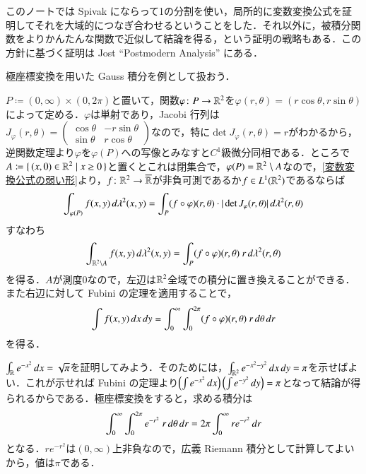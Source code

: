 \begin{que}[**]
このノートでは Spivak にならって1の分割を使い，局所的に変数変換公式を証明してそれを大域的につなぎ合わせるということをした．それ以外に，被積分関数をよりかんたんな関数で近似して結論を得る，という証明の戦略もある．この方針に基づく証明は Jost ``Postmodern Analysis'' にある．
\end{que}

極座標変換を用いた Gauss 積分を例として扱おう．

\begin{exm}[極座標変換]$P \coloneqq (0, \infty) \times (0,2\pi)$と置いて，関数$\varphi \colon P \to \mathbb{R}^2$を$\varphi(r,\theta) = (r \cos \theta, r \sin \theta)$によって定める．$\varphi$は単射であり，Jacobi 行列は$
J_{\varphi}(r,\theta) =
    \begin{pmatrix}
    \cos \theta & -r \sin \theta \\
    \sin \theta & r \cos \theta
    \end{pmatrix}
$なので，特に$\det J_\varphi(r,\theta) = r$がわかるから，逆関数定理より$\varphi$を$\varphi(P)$への写像とみなすと$C^1$級微分同相である．ところで$A \coloneqq \set{(x,0) \in \mathbb{R}^2 | x \geq 0}$と置くとこれは閉集合で，$\varphi(P) = \mathbb{R}^2 \setminus A$なので，\cref{変数変換公式の弱い形}より，$f \colon \mathbb{R}^2 \to \overline{\mathbb{R}}$が非負可測であるか$f \in L^1(\mathbb{R}^2)$であるならば
\begin{equation}
\int_{\varphi(P)} f(x,y) \mathop{}\!d \lambda^2(x,y) = \int_P (f \circ \varphi) (r, \theta) \cdot |\det J_\varphi (r,\theta)| \mathop{}\!d\lambda^2(r,\theta)
\end{equation}すなわち
\begin{equation}
\int_{\mathbb{R}^2 \setminus A} f(x,y) \mathop{}\!d \lambda^2(x,y) = \int_P (f \circ \varphi) (r, \theta) \ r \mathop{}\!d\lambda^2(r,\theta)
\end{equation}を得る．$A$が測度0なので，左辺は$\mathbb{R}^2$全域での積分に置き換えることができる．また右辺に対して Fubini の定理を適用することで，
\begin{equation}
\int f(x,y) \mathop{}\!d x \mathop{}\!d y = \int_0^\infty \int_0^{2\pi} (f \circ \varphi) (r, \theta) \ r\mathop{}\!d\theta \mathop{}\!d r
\end{equation}を得る．
\end{exm}

\begin{exm}[Gauss 積分]$\int_{\mathbb{R}} e^{-x^2} \mathop{}\!d x = \sqrt{\pi}$を証明してみよう．そのためには，$\int_{\mathbb{R}^2} e^{-x^2-y^2} \mathop{}\!d x \mathop{}\!d y = \pi$を示せばよい．これが示せれば Fubini の定理より$\left(\int e^{-x^2} \mathop{}\!d x \right) \left(\int e^{-y^2} \mathop{}\!d y \right) = \pi$となって結論が得られるからである．極座標変換をすると，求める積分は
\begin{equation}
\int_0^\infty \int_0^{2\pi} e^{-r^2} \ r\dif\theta \dif r = 2\pi \int_0^\infty re^{-r^2} \dif r
\end{equation}となる．$re^{-r^2}$は$(0,\infty)$上非負なので，広義 Riemann 積分として計算してよいから，値は$\pi$である．
\end{exm}

